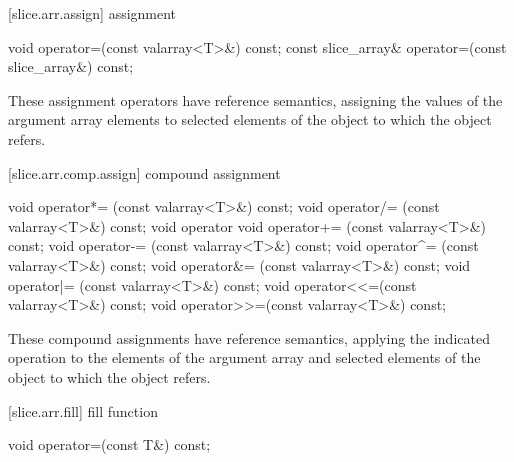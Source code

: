[slice.arr.assign]{ assignment}

%
\begin{itemdecl}
void operator=(const valarray<T>&) const;
const slice_array& operator=(const slice_array&) const;
\end{itemdecl}

\begin{itemdescr}
\pnum
These assignment operators have reference semantics,
assigning the values of the argument array elements to selected
elements of the
object to which the
object refers.
\end{itemdescr}

[slice.arr.comp.assign]{ compound assignment}

%
%
%
%
%
%
%
%
%
%
\begin{itemdecl}
void operator*= (const valarray<T>&) const;
void operator/= (const valarray<T>&) const;
void operator%
void operator+= (const valarray<T>&) const;
void operator-= (const valarray<T>&) const;
void operator^= (const valarray<T>&) const;
void operator&= (const valarray<T>&) const;
void operator|= (const valarray<T>&) const;
void operator<<=(const valarray<T>&) const;
void operator>>=(const valarray<T>&) const;
\end{itemdecl}

\begin{itemdescr}
\pnum
These compound assignments have reference semantics, applying the
indicated operation to the elements of the argument array
and selected elements of the
object to which the
object refers.
\end{itemdescr}

[slice.arr.fill]{ fill function}

%
\begin{itemdecl}
void operator=(const T&) const;
\end{itemdecl}

